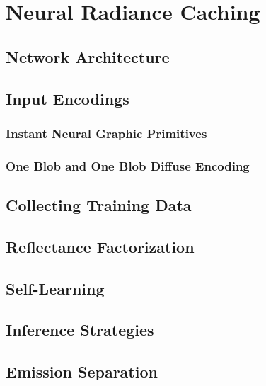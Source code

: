 
\chapter{Neural Radiance Caching}
\label{chap:nrc}

\section{Network Architecture}

\section{Input Encodings}

\subsection{Instant Neural Graphic Primitives}

\subsection{One Blob and One Blob Diffuse Encoding}

\section{Collecting Training Data}

\section{Reflectance Factorization}

\section{Self-Learning}

\section{Inference Strategies}

\section{Emission Separation}
